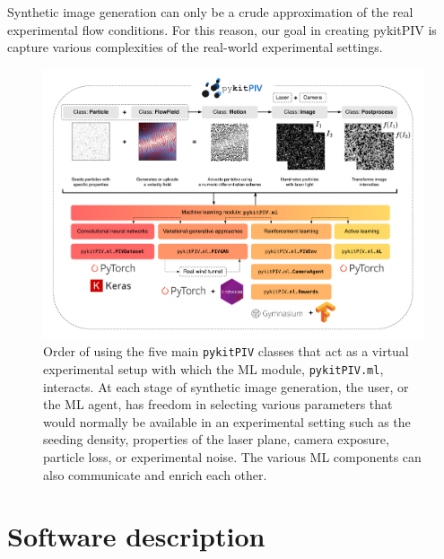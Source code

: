 \documentclass[a4paper,fleqn]{cas-dc}
\begin{document}


Synthetic image generation can only be a crude approximation of the real experimental flow conditions. For this reason, our goal in creating pykitPIV is capture various complexities of the real-world experimental settings.


\begin{figure}[t]
\centering
\vspace{-0.4 in}
\includegraphics[width=\textwidth]{pykitPIV-modules.pdf}
\vspace{10 pt}
\caption{\footnotesize Order of using the five main \texttt{pykitPIV} classes that act as a virtual experimental setup with which the ML module, \texttt{pykitPIV.ml}, interacts. At each stage of synthetic image generation, the user, or the ML agent, has freedom in selecting various parameters that would normally be available in an experimental setting such as the seeding density, properties of the laser plane, camera exposure, particle loss, or experimental noise. The various ML components can also communicate and enrich each other.}
\label{fig:pykitPIV-overview}
\end{figure}

\section{Software description} \label{sec:software}

\end{document}
